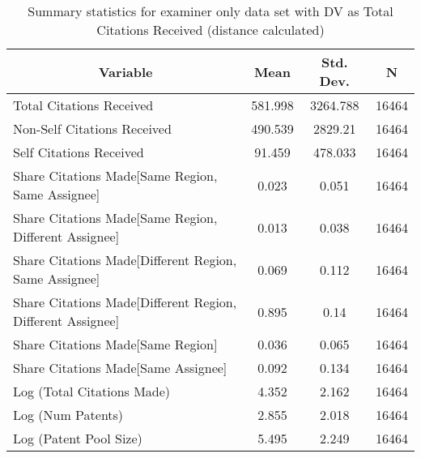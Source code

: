
\begin{table}[htbp]\centering \caption{Summary statistics for examiner only data set with DV as Total Citations Received (distance calculated) \label{e.tsummary}}
\scriptsize
\singlespacing
\begin{tabular}{l c c  c}\hline\hline
\multicolumn{1}{c}{\textbf{Variable}} & \textbf{Mean}
 & \textbf{Std. Dev.} & \textbf{N}\\ \hline
Total Citations Received & 581.998 & 3264.788  & 16464\\
Non-Self Citations Received & 490.539 & 2829.21  & 16464\\
Self Citations Received & 91.459 & 478.033  & 16464\\
Share Citations Made[Same Region, Same Assignee] & 0.023 & 0.051  & 16464\\
Share Citations Made[Same Region, Different Assignee] & 0.013 & 0.038  & 16464\\
Share Citations Made[Different Region, Same Assignee] & 0.069 & 0.112  & 16464\\
Share Citations Made[Different Region, Different Assignee] & 0.895 & 0.14  & 16464\\
Share Citations Made[Same Region] & 0.036 & 0.065  & 16464\\
Share Citations Made[Same Assignee] & 0.092 & 0.134  & 16464\\
Log (Total Citations Made) & 4.352 & 2.162  & 16464\\
Log (Num Patents) & 2.855 & 2.018  & 16464\\
Log (Patent Pool Size) & 5.495 & 2.249  & 16464\\
\hline\end{tabular}
\end{table}
